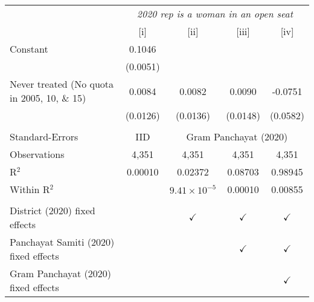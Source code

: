 
\begingroup
\centering
\begin{tabular}{lcccc}
   \toprule
    & \multicolumn{4}{c}{\textit{2020 rep is a woman in an open seat}}\\
                                                & [i]      & [ii]                  & [iii]         & [iv]\\  
   \midrule 
   Constant                                     & 0.1046   &                       &               &   \\   
                                                & (0.0051) &                       &               &   \\   
   Never treated (No quota in 2005, 10, \& 15)  & 0.0084   & 0.0082                & 0.0090        & -0.0751\\   
                                                & (0.0126) & (0.0136)              & (0.0148)      & (0.0582)\\   
    \\
   Standard-Errors & IID & \multicolumn{3}{c}{Gram Panchayat (2020)} \\ 
   Observations                                 & 4,351    & 4,351                 & 4,351         & 4,351\\  
   R$^2$                                        & 0.00010  & 0.02372               & 0.08703       & 0.98945\\  
   Within R$^2$                                 &          & $9.41\times 10^{-5}$  & 0.00010       & 0.00855\\  
    \\
   District (2020) fixed effects                &          & $\checkmark$          & $\checkmark$  & $\checkmark$\\   
   Panchayat Samiti (2020) fixed effects        &          &                       & $\checkmark$  & $\checkmark$\\   
   Gram Panchayat (2020) fixed effects          &          &                       &               & $\checkmark$\\   
   \bottomrule
\end{tabular}
\par\endgroup


